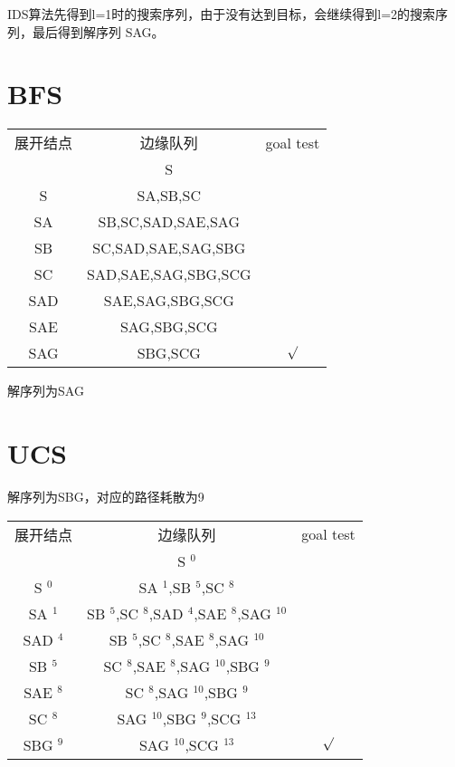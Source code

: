 \documentclass[12pt, a4paper, oneside]{ctexart}
\begin{document}
IDS算法先得到l=1时的搜索序列，由于没有达到目标，会继续得到l=2的搜索序列，最后得到解序列 SAG。
\section{BFS}
\begin{table}[!hb]
    \centering 
    \begin{tabular}{ccc}
   展开结点&边缘队列&goal test\\
              &S      &          \\
       S      &SA,SB,SC     &         \\
       SA      &SB,SC,SAD,SAE,SAG     &         \\
       SB      &SC,SAD,SAE,SAG,SBG     &         \\
       SC      &SAD,SAE,SAG,SBG,SCG     &         \\
       SAD      &SAE,SAG,SBG,SCG     &         \\
       SAE      &SAG,SBG,SCG     &         \\
       SAG      &SBG,SCG     &   $\surd$      \\
    \end{tabular}
\end{table}
解序列为SAG
\section{UCS}
解序列为SBG，对应的路径耗散为9
\begin{table}[!h]
    \centering 
    \begin{tabular}{ccc}
   展开结点&边缘队列&goal test\\
              &S $^0$      &          \\
       S $^0$     &SA $^1$,SB $^5$,SC $^8$     &         \\
        SA $^1$    &SB $^5$,SC $^8$,SAD $^4$,SAE $^8$,SAG $^{10}$     &         \\
        SAD $^4$   &SB $^5$,SC $^8$,SAE $^8$,SAG $^{10}$     &         \\
        SB $^5$ &SC $^8$,SAE $^8$,SAG $^{10}$,SBG $^9$     &         \\
        SAE $^8$ &SC $^8$,SAG $^{10}$,SBG $^9$     &         \\
         SC $^8$&SAG $^{10}$,SBG $^9$,SCG $^{13}$     &         \\
         SBG $^9$&SAG $^{10}$,SCG $^{13}$     &     $\surd$    \\
    \end{tabular}
\end{table}
\end{document}
